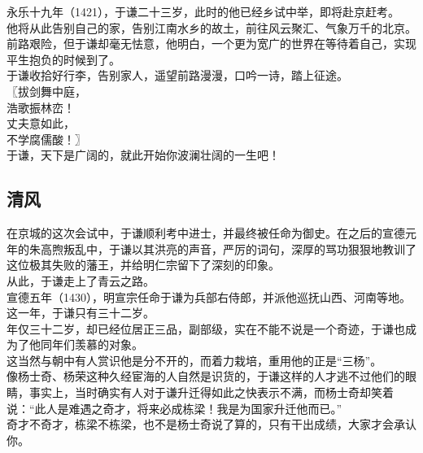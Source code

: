 \begin{multicols}{\theparacolNo}
永乐十九年（1421），于谦二十三岁，此时的他已经乡试中举，即将赴京赶考。\\

他将从此告别自己的家，告别江南水乡的故土，前往风云聚汇、气象万千的北京。\\

前路艰险，但于谦却毫无怯意，他明白，一个更为宽广的世界在等待着自己，实现平生抱负的时候到了。\\

于谦收拾好行李，告别家人，遥望前路漫漫，口吟一诗，踏上征途。\\

〖拔剑舞中庭，\\

浩歌振林峦！\\

丈夫意如此，\\

不学腐儒酸！〗\\

于谦，天下是广阔的，就此开始你波澜壮阔的一生吧！\\

\subsection{清风}
在京城的这次会试中，于谦顺利考中进士，并最终被任命为御史。在之后的宣德元年的朱高煦叛乱中，于谦以其洪亮的声音，严厉的词句，深厚的骂功狠狠地教训了这位极其失败的藩王，并给明仁宗留下了深刻的印象。\\

从此，于谦走上了青云之路。\\

宣德五年（1430），明宣宗任命于谦为兵部右侍郎，并派他巡抚山西、河南等地。这一年，于谦只有三十二岁。\\

年仅三十二岁，却已经位居正三品，副部级，实在不能不说是一个奇迹，于谦也成为了他同年们羡慕的对象。\\

这当然与朝中有人赏识他是分不开的，而着力栽培，重用他的正是“三杨”。\\

像杨士奇、杨荣这种久经宦海的人自然是识货的，于谦这样的人才逃不过他们的眼睛，事实上，当时确实有人对于谦升迁得如此之快表示不满，而杨士奇却笑着说：“此人是难遇之奇才，将来必成栋梁！我是为国家升迁他而已。”\\

奇才不奇才，栋梁不栋梁，也不是杨士奇说了算的，只有干出成绩，大家才会承认你。\\


\end{multicols}
